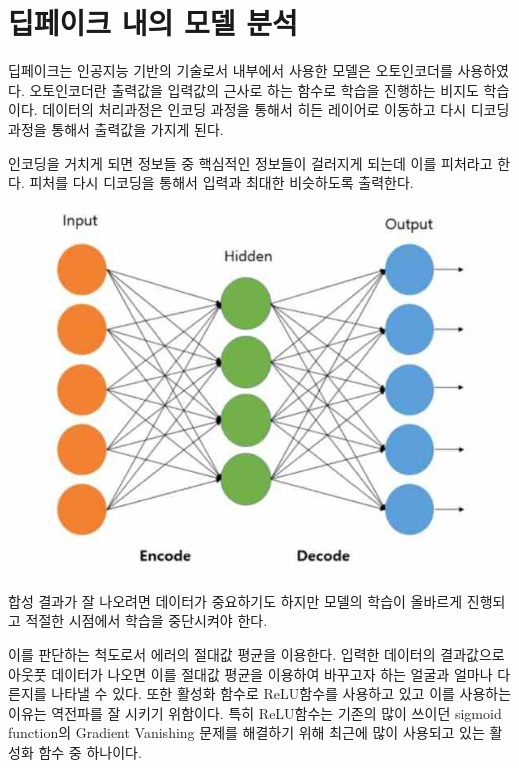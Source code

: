 \documentclass[chapter,oneside]{oblivoir}
\begin{document}
\section{ 딥페이크 내의 모델 분석}

딥페이크는 인공지능 기반의 기술로서 내부에서 사용한 모델은 오토인코더를 사용하였다. 오토인코더란 출력값을 입력값의 근사로 하는 함수로 학습을 진행하는 비지도 학습이다. 데이터의 처리과정은 인코딩 과정을 통해서 히든 레이어로 이동하고 다시 디코딩 과정을 통해서 출력값을 가지게 된다.

인코딩을 거치게 되면 정보들 중 핵심적인 정보들이 걸러지게 되는데 이를 피처라고 한다. 피처를 다시 디코딩을 통해서 입력과 최대한 비슷하도록 출력한다.

\begin{figure}[h!]
\centering
\includegraphics{pic/chp4/img802}

\end{figure}

합성 결과가 잘 나오려면 데이터가 중요하기도 하지만 모델의 학습이 올바르게 진행되고 적절한 시점에서 학습을 중단시켜야 한다.

이를 판단하는 척도로서 에러의 절대값 평균을 이용한다. 입력한 데이터의 결과값으로 아웃풋 데이터가 나오면 이를 절대값 평균을 이용하여 바꾸고자 하는 얼굴과 얼마나 다른지를 나타낼 수 있다. 또한 활성화 함수로 ReLU함수를 사용하고 있고 이를 사용하는 이유는 역전파를 잘 시키기 위함이다. 특히 ReLU함수는 기존의 많이 쓰이던 sigmoid function의 Gradient Vanishing 문제를 해결하기 위해 최근에 많이 사용되고 있는 활성화 함수 중 하나이다.
\end{document}
